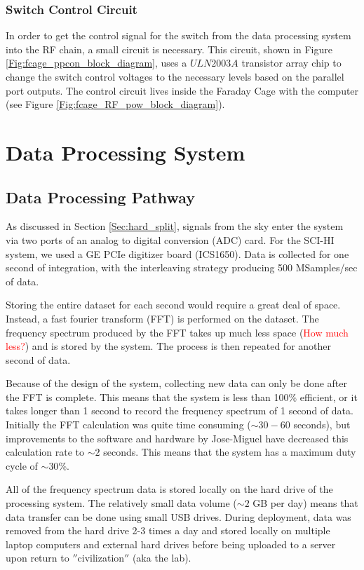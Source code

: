 \subsubsection{Switch Control Circuit}
In order to get the control signal for the switch from the data processing system into the RF chain, a small circuit is necessary. This circuit, shown in Figure \ref{Fig:fcage_ppcon_block_diagram}, uses a $ULN2003A$ transistor array chip to change the switch control voltages to the necessary levels based on the parallel port outputs. The control circuit lives inside the Faraday Cage with the computer (see Figure \ref{Fig:fcage_RF_pow_block_diagram}). 

\section{Data Processing System}

\subsection{Data Processing Pathway}
As discussed in Section \ref{Sec:hard_split}, signals from the sky enter the system via two ports of an analog to digital conversion (ADC) card. For the SCI-HI system, we used a GE PCIe digitizer board (ICS1650). Data is collected for one second of integration, with the interleaving strategy producing 500 MSamples/sec of data. 

Storing the entire dataset for each second would require a great deal of space. Instead, a fast fourier transform (FFT) is performed on the dataset. The frequency spectrum produced by the FFT takes up much less space (\textcolor{red}{How much less?}) and is stored by the system. The process is then repeated for another second of data. 

Because of the design of the system, collecting new data can only be done after the FFT is complete. This means that the system is less than 100\% efficient, or it takes longer than 1 second to record the frequency spectrum of 1 second of data. Initially the FFT calculation was quite time consuming ($\sim 30-60$ seconds), but improvements to the software and hardware by Jose-Miguel have decreased this calculation rate to $\sim 2$ seconds. This means that the system has a maximum duty cycle of $\sim30$\%. 

All of the frequency spectrum data is stored locally on the hard drive of the processing system. The relatively small data volume ($\sim 2$ GB per day) means that data transfer can be done using small USB drives. During deployment, data was removed from the hard drive 2-3 times a day and stored locally on multiple laptop computers and external hard drives before being uploaded to a server upon return to $''$civilization$''$ (aka the lab). 

